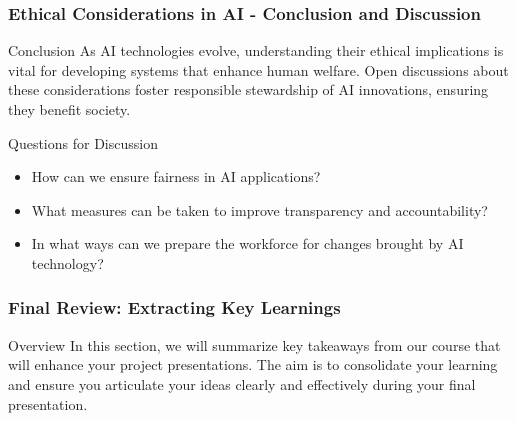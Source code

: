 \documentclass[aspectratio=169]{beamer}
\begin{document}
\begin{frame}[fragile]
    \frametitle{Ethical Considerations in AI - Conclusion and Discussion}
    \begin{block}{Conclusion}
        As AI technologies evolve, understanding their ethical implications is vital for developing systems that enhance human welfare. 
        Open discussions about these considerations foster responsible stewardship of AI innovations, ensuring they benefit society.
    \end{block}
    
    \begin{block}{Questions for Discussion}
        \begin{itemize}
            \item How can we ensure fairness in AI applications?
            \item What measures can be taken to improve transparency and accountability?
            \item In what ways can we prepare the workforce for changes brought by AI technology?
        \end{itemize}
    \end{block}
\end{frame}

\begin{frame}[fragile]
    \frametitle{Final Review: Extracting Key Learnings}

    \begin{block}{Overview}
        In this section, we will summarize key takeaways from our course that will enhance your project presentations.
        The aim is to consolidate your learning and ensure you articulate your ideas clearly and effectively during your final presentation.
    \end{block}
\end{frame}
\end{document}
